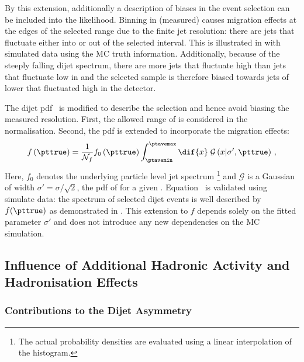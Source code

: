 By this extension, additionally a description of biases in the event selection can be included into the likelihood.
Binning in (measured) \ptave causes migration effects at the edges of the selected \ptave range due to the finite jet \pt resolution:
there are jets that fluctuate either into or out of the selected interval.
This is illustrated in  with simulated data using the MC truth information.
Additionally, because of the steeply falling dijet \pt spectrum, there are more jets that fluctuate high than jets that fluctuate low in \pt and the selected sample is therefore biased towards jets of lower \ptgen that fluctuated high in the detector.

The dijet pdf~ is modified to describe the
\ptave selection and hence avoid biasing the measured resolution.
First, the allowed range of \ptave is considered in the normalisation. 
Second, the \pttrue pdf is extended to incorporate the migration effects:
\begin{equation}
  \label{eq:ResFit:DataDriven:ModifiedSpectrum}
  f\left(\pttrue\right) = \frac{1}{\mathcal{N}_{f}}
  f_{0}\left(\pttrue\right) \int^{\ptavemax}_{\ptavemin}\dif{x}\;\mathcal{G}\left(x|\sigma',\pttrue\right) \, ,
\end{equation}
Here, $f_{0}$ denotes the underlying particle level jet \pt spectrum \footnote{The actual probability densities are evaluated using a linear interpolation of the histogram.} and $\mathcal{G}$ is a Gaussian of width \mbox{$\sigma' = \sigma/\sqrt{2}$}, \ie the pdf of \ptave for a given \pttrue.
Equation~ is validated using simulate data:
the \ptgen spectrum of selected dijet events is well described by $f(\pttrue)$ as demonstrated in .
This extension to $f$ depends solely on the fitted parameter $\sigma'$ and does not introduce any new dependencies on the MC simulation.



\subsection{Influence of Additional Hadronic Activity and Hadronisation Effects}\label{sec:ResFit:DataDriven:AddJets}

\subsubsection{Contributions to the Dijet Asymmetry}\label{sec:ResFit:DataDriven:AddJets:Contributions}

